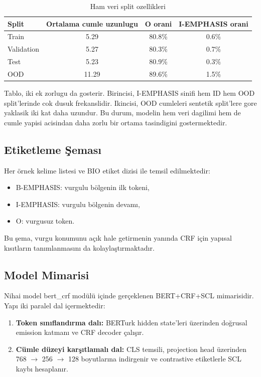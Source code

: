 \documentclass[conference]{IEEEtran}
\begin{document}
\begin{table}[H]
\centering
\caption{Ham veri split ozellikleri}
\begin{tabular}{lccc}
\toprule
Split & Ortalama cumle uzunlugu & O orani & I-EMPHASIS orani \\
\midrule
Train & 5.29 & 80.8\% & 0.6\% \\
Validation & 5.27 & 80.3\% & 0.7\% \\
Test & 5.23 & 80.9\% & 0.3\% \\
OOD & 11.29 & 89.6\% & 1.5\% \\
\bottomrule
\end{tabular}
\end{table}

Tablo, iki ek zorlugu da gosterir. Birincisi, I-EMPHASIS sinifi hem ID hem OOD split'lerinde cok dusuk frekanslidir. Ikincisi, OOD cumleleri sentetik split'lere gore yaklasik iki kat daha uzundur. Bu durum, modelin hem veri dagilimi hem de cumle yapisi acisindan daha zorlu bir ortama tasindigini gostermektedir.

\subsection{Etiketleme Şeması}
Her örnek kelime listesi ve BIO etiket dizisi ile temsil edilmektedir:
\begin{itemize}
    \item B-EMPHASIS: vurgulu bölgenin ilk tokeni,
    \item I-EMPHASIS: vurgulu bölgenin devamı,
    \item O: vurgusuz token.
\end{itemize}

Bu şema, vurgu konumunu açık hale getirmenin yanında CRF için yapısal kısıtların tanımlanmasını da kolaylaştırmaktadır.

\subsection{Model Mimarisi}
Nihai model bert\_crf modülü içinde gerçeklenen BERT+CRF+SCL mimarisidir. Yapı iki paralel dal içermektedir:
\begin{enumerate}
    \item \textbf{Token sınıflandırma dalı:} BERTurk hidden state'leri üzerinden doğrusal emission katmanı ve CRF decoder çalışır.
    \item \textbf{Cümle düzeyi karşıtlamalı dal:} CLS temsili, projection head üzerinden 768 $\rightarrow$ 256 $\rightarrow$ 128 boyutlarına indirgenir ve contrastive etiketlerle SCL kaybı hesaplanır.
\end{enumerate}
\end{document}
